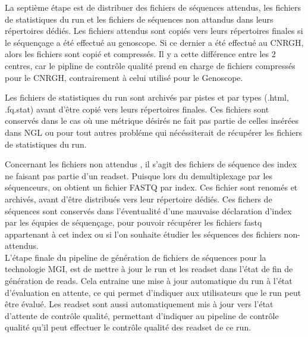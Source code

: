 La septième étape est de distribuer des fichiers de séquences \og attendus\fg{}, les fichiers de statistiques du run et les fichiers de séquences \og non attandus\fg{} dans leurs répertoires dédiés.
Les fichiers attendus sont copiés vers leurs répertoires finales si le séquençage a été effectué au genoscope.
Si ce dernier a été effectué au CNRGH, alors les fichiers sont copié et compressés.
Il y a cette différence entre les 2 centres, car le pipline de contrôle qualité prend en charge de fichiers compressés pour le CNRGH, contrairement à celui utilisé pour le Genoscope.

Les fichiers de statistiques du run sont archivés par pistes et par types (.html, .fq.stat) avant d'être copié vers leurs répertoires finales.
Ces fichiers sont conservés dans le cas où une métrique désirés ne fait pas partie de celles insérées dans NGL ou pour tout autres probléme qui nécéssiterait de récupérer les fichiers de statistiques du run.

Concernant les fichiers \og non attendus \fg{}, il s'agit des fichiers de séquence des index ne faisant pas partie d'un readset. Puisque lors du demultiplexage par les séquenceurs, on obtient un fichier FASTQ par index.
Ces fichier sont renomés et archivés, avant d'être distribués vers leur répertoire dédiés.
Ces fichers de séquences sont conservés dans l'éventualité d'une mauvaise déclaration d'index par les équpies de séquençage, pour pouvoir récupérer les fichiers fastq appartenant à cet index ou si l'on souhaite étudier les séquences des fichiers \og non-attendus\fg{}.\\

L'étape finale du pipeline de génération de fichiers de séquences pour la technologie MGI, est de mettre à jour le run et les readset dans l'état de \og fin de génération de reads\fg{}.
Cela entraine une mise à jour automatique du run à l'état \og d'évaluation en attente\fg{}, ce qui permet d'indiquer aux utilisateurs que le run peut être évalué.
Les readset sont aussi automatiquement mis à jour vers l'état \og d'attente de contrôle qualité\fg{}, permettant d'indiquer au pipeline de contrôle qualité qu'il peut effectuer le contrôle qualité des readset de ce run.

